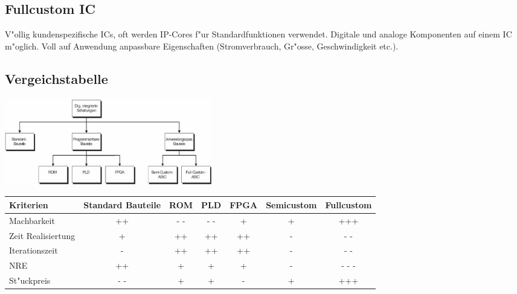 \subsection{Fullcustom IC}
V"ollig kundenspezifische ICs, oft werden IP-Cores f"ur Standardfunktionen verwendet. Digitale und analoge Komponenten auf einem IC m"oglich. Voll auf Anwendung anpassbare Eigenschaften (Stromverbrauch, Gr"osse, Geschwindigkeit etc.).\\

\subsection{Vergeichstabelle}

\begin{center}
	\includegraphics[width=0.40\textwidth]{pics/devicecomparetables}
	
	\begin{tabular}{|l|c|c|c|c|c|c|}
		\hline
		Kriterien & Standard Bauteile & ROM & PLD & FPGA & Semicustom & Fullcustom \\
		\hline
		Machbarkeit & ++ & - - & - - & + & + & +++ \\
		\hline
		Zeit Realisiertung & + & ++ & ++ & ++ & - & - - \\
		\hline
		Iterationszeit & - & ++ & ++ & ++ & - & - - \\
		\hline
		NRE & ++ & + & + & + & - & - - -\\
		\hline
		St"uckpreis & - - & + & + & - & + & +++ \\
		\hline
	\end{tabular}
\end{center}
	